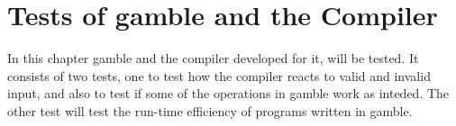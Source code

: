 \chapter{Tests of \gls{gamble} and the Compiler} %
In this chapter \gls{gamble} and the compiler developed for it, will be tested.
It consists of two tests, one to test how the compiler reacts to valid and invalid input, and also to test if some of the operations in \gls{gamble} work as inteded. 
The other test will test the run-time efficiency of programs written in \gls{gamble}.

